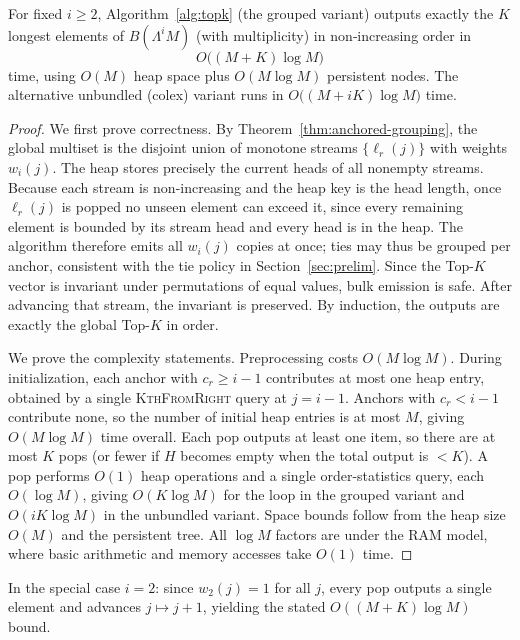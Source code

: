 \documentclass[runningheads]{llncs}
\newcommand{\B}{B}
\newcommand{\Lam}{\Lambda}
\begin{document}
\begin{theorem}\label{thm:topk-correctness-complexity}
For fixed $i\ge 2$, Algorithm~\ref{alg:topk} (the grouped variant) outputs exactly the $K$ longest elements of $\B(\Lam^i M)$ (with multiplicity) in non‑increasing order in
$$O\bigl((M+K)\log M\bigr)$$
time, using $O(M)$ heap space plus $O(M\log M)$ persistent nodes.
The alternative unbundled (colex) variant runs in $O\bigl((M+iK)\log M\bigr)$ time.
\end{theorem}



\begin{proof}
We first prove correctness. By Theorem~\ref{thm:anchored-grouping}, the global multiset is
the disjoint union of monotone streams $\{\ell_r(j)\}$ with weights $w_i(j)$.
The heap stores precisely the current heads of all nonempty streams. Because each
stream is non-increasing and the heap key is the head length, once $\ell_r(j)$
is popped no unseen element can exceed it, since every remaining element is
bounded by its stream head and every head is in the heap. The algorithm therefore
emits all $w_i(j)$ copies at once; ties may thus be grouped per anchor, consistent
with the tie policy in Section~\ref{sec:prelim}. Since the Top-$K$ vector is
invariant under permutations of equal values, bulk emission is safe. After advancing
that stream, the invariant is preserved. By induction, the outputs are exactly the
global Top-$K$ in order.

We prove the complexity statements. Preprocessing costs $O(M \log M)$. During initialization,
each anchor with $c_r \ge i-1$ contributes at most one heap entry, obtained by a
single \textsc{KthFromRight} query at $j=i-1$. Anchors with $c_r < i-1$ contribute
none, so the number of initial heap entries is at most $M$, giving $O(M \log M)$
time overall. Each pop outputs at least one item, so there are at most $K$ pops
(or fewer if $H$ becomes empty when the total output is $<K$). A pop performs
$O(1)$ heap operations and a single order-statistics query, each $O(\log M)$,
giving $O(K\log M)$ for the loop in the grouped variant and $O(iK\log M)$ in the
unbundled variant. Space bounds follow from the heap size $O(M)$ and the
persistent tree. All $\log M$ factors are under the RAM model, where basic
arithmetic and memory accesses take $O(1)$ time.
\end{proof}

In the special case $i=2$: since $w_2(j)=1$ for all $j$, every pop outputs a single element and advances $j\mapsto j{+}1$, yielding the stated $O((M+K)\log M)$ bound.
\end{document}

